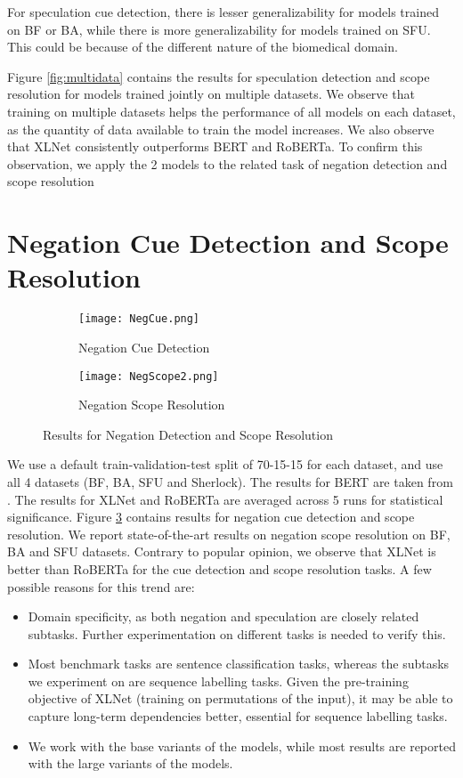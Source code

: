 \documentclass[runningheads]{llncs}
\begin{document}
For speculation cue detection, there is lesser generalizability for models trained on BF or BA, while there is more generalizability for models trained on SFU. This could be because of the different nature of the biomedical domain.
\par Figure \ref{fig:multidata} contains the results for speculation detection and scope resolution for models trained jointly on multiple datasets. We observe that training on multiple datasets helps the performance of all models on each dataset, as the quantity of data available to train the model increases.
We also observe that XLNet consistently outperforms BERT and RoBERTa. To confirm this observation, we apply the 2 models to the related task of negation detection and scope resolution

\section{Negation Cue Detection and Scope Resolution}
\begin{figure}[!htb]
\begin{subfigure}{0.44\textwidth}
    \texttt{[image: NegCue.png]}
    \caption{Negation Cue Detection}
    \label{fig:negcue}
\end{subfigure}
\begin{subfigure}{0.54\textwidth}
    \texttt{[image: NegScope2.png]}
    \caption{Negation Scope Resolution}
    \label{fig:negscope}
\end{subfigure}

\caption{Results for Negation Detection and Scope Resolution}
\label{fig:neg}
\end{figure}
\noindent
\par We use a default train-validation-test split of 70-15-15 for each dataset, and use all 4 datasets (BF, BA, SFU and Sherlock). The results for BERT are taken from \cite{2019arXiv191104211K}. The results for XLNet and RoBERTa are averaged across 5 runs for statistical significance. Figure \ref{fig:neg} contains results for negation cue detection and scope resolution.
We report state-of-the-art results on negation scope resolution on BF, BA and SFU datasets.
Contrary to popular opinion, we observe that XLNet is better than RoBERTa for the cue detection and scope resolution tasks. A few possible reasons for this trend are:

\begin{itemize}
    \item Domain specificity, as both negation and speculation are closely related subtasks. Further experimentation on different tasks is needed to verify this.
    \item Most benchmark tasks are sentence classification tasks, whereas the subtasks we experiment on are sequence labelling tasks. Given the pre-training objective of XLNet (training on permutations of the input), it may be able to capture long-term dependencies better, essential for sequence labelling tasks.
    \item We work with the base variants of the models, while most results are reported with the large variants of the models.
\end{itemize}
\end{document}
